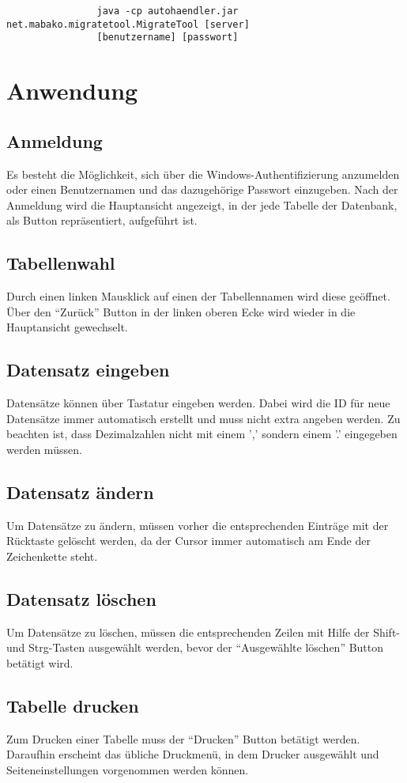 			\begin{verbatim}
				java -cp autohaendler.jar net.mabako.migratetool.MigrateTool [server]
				[benutzername] [passwort]
			\end{verbatim}
	
\chapter{Anwendung}
	\section{Anmeldung}
		Es besteht die Möglichkeit, sich über die Windows-Authentifizierung anzumelden
		oder einen Benutzernamen und das dazugehörige Passwort einzugeben.
		Nach der Anmeldung wird die Hauptansicht angezeigt, in der jede Tabelle der
		Datenbank, als Button repräsentiert, aufgeführt ist.
		
	\section{Tabellenwahl}
		Durch einen linken Mausklick auf einen der Tabellennamen wird diese geöffnet.
		Über den "`Zurück"' Button in der linken oberen Ecke wird wieder in die
		Hauptansicht gewechselt.
		
	\section{Datensatz eingeben}
		Datensätze können über Tastatur eingeben werden. Dabei wird die ID für
		neue Datensätze immer automatisch erstellt und muss nicht extra angeben
		werden.
		Zu beachten ist, dass Dezimalzahlen nicht mit einem ',' sondern einem '.'
		eingegeben werden müssen.
		
	\section{Datensatz ändern}
		Um Datensätze zu ändern, müssen vorher die entsprechenden Einträge mit der
		Rücktaste gelöscht werden, da der Cursor immer automatisch am Ende der
		Zeichenkette steht.
		
	\section{Datensatz löschen}
		Um Datensätze zu löschen, müssen die entsprechenden Zeilen mit Hilfe der
		Shift- und Strg-Tasten ausgewählt werden, bevor der "`Ausgewählte löschen"'
		Button betätigt wird.
		
	\section{Tabelle drucken}
		Zum Drucken einer Tabelle muss der "`Drucken"' Button betätigt werden.
		Daraufhin erscheint das übliche Druckmenü, in dem Drucker ausgewählt und
		Seiteneinstellungen vorgenommen werden können.
	